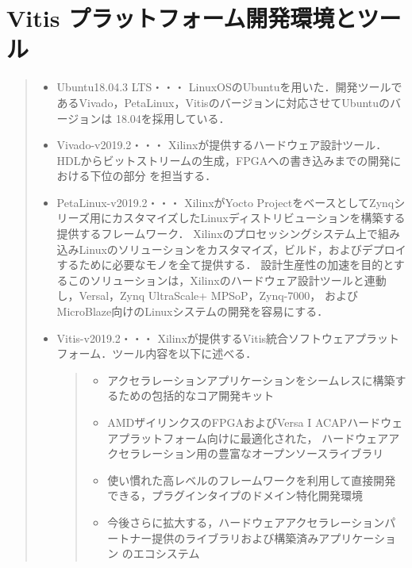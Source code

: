 \documentclass[11pt,a4j]{jreport}
\begin{document}
\section{Vitis プラットフォーム開発環境とツール}
\begin{quote}
  \begin{itemize}
    \item Ubuntu18.04.3 LTS・・・
    LinuxOSのUbuntuを用いた．開発ツールであるVivado，PetaLinux，Vitisのバージョンに対応させてUbuntuのバージョンは
    18.04を採用している．
    \item Vivado-v2019.2・・・
    Xilinxが提供するハードウェア設計ツール．HDLからビットストリームの生成，FPGAへの書き込みまでの開発における下位の部分
    を担当する．
    \item PetaLinux-v2019.2・・・
    XilinxがYocto ProjectをベースとしてZynqシリーズ用にカスタマイズしたLinuxディストリビューションを構築する提供するフレームワーク．
    Xilinxのプロセッシングシステム上で組み込みLinuxのソリューションをカスタマイズ，ビルド，およびデプロイするために必要なモノを全て提供する．
    設計生産性の加速を目的とするこのソリューションは，Xilinxのハードウェア設計ツールと連動し，Versal，Zynq UltraScale+ MPSoP，Zynq-7000，
    およびMicroBlaze向けのLinuxシステムの開発を容易にする．
    \item Vitis-v2019.2・・・
    Xilinxが提供するVitis統合ソフトウェアプラットフォーム．ツール内容を以下に述べる．
    \begin{quote}
      \begin{itemize}
        \item アクセラレーションアプリケーションをシームレスに構築するための包括的なコア開発キット
        \item AMDザイリンクスのFPGAおよびVersa I ACAPハードウェアプラットフォーム向けに最適化された，
        ハードウェアアクセラレーション用の豊富なオープンソースライブラリ
        \item 使い慣れた高レベルのフレームワークを利用して直接開発できる，プラグインタイプのドメイン特化開発環境
        \item 今後さらに拡大する，ハードウェアアクセラレーションパートナー提供のライブラリおよび構築済みアプリケーション
        のエコシステム
      \end{itemize}
    \end{quote}
  \end{itemize}
\end{quote}
\end{document}
